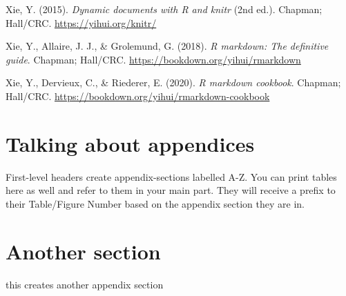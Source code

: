\documentclass[
  man]{apa7}
\newlength{\cslhangindent}
\newlength{\cslentryspacingunit} %
\newenvironment{CSLReferences}[2] %
 {%
  \setlength{\parindent}{0pt}
  \ifodd #1
  \let\oldpar\par
  \def\par{\hangindent=\cslhangindent\oldpar}
  \fi
  \setlength{\parskip}{#2\cslentryspacingunit}
 }%
 {}
\begin{document}
\begin{CSLReferences}{1}{0}
\leavevmode{}%
Xie, Y. (2015). \emph{Dynamic documents with {R} and knitr} (2nd ed.). Chapman; Hall/CRC. \url{https://yihui.org/knitr/}

\leavevmode{}%
Xie, Y., Allaire, J. J., \& Grolemund, G. (2018). \emph{R markdown: The definitive guide}. Chapman; Hall/CRC. \url{https://bookdown.org/yihui/rmarkdown}

\leavevmode{}%
Xie, Y., Dervieux, C., \& Riederer, E. (2020). \emph{R markdown cookbook}. Chapman; Hall/CRC. \url{https://bookdown.org/yihui/rmarkdown-cookbook}

\end{CSLReferences}

\newpage

\hypertarget{appendix-appendix}{%
\appendix}


\hypertarget{talking-about-appendices}{%
\section{Talking about appendices}\label{talking-about-appendices}}

First-level headers create appendix-sections labelled A-Z. You can print tables here as well and refer to them in your main part. They will receive a prefix to their Table/Figure Number based on the appendix section they are in.

\hypertarget{another-section}{%
\section{Another section}\label{another-section}}

this creates another appendix section
\end{document}

